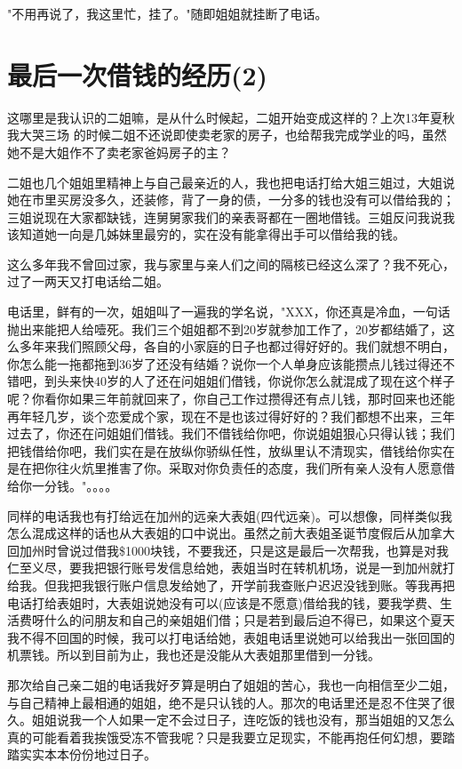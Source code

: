 \documentclass[12pt]{book}
\begin{document}
"不用再说了，我这里忙，挂了。"随即姐姐就挂断了电话。
\section{最后一次借钱的经历(2)}
\label{sec-33-2}
这哪里是我认识的二姐嘛，是从什么时候起，二姐开始变成这样的？上次13年夏秋我大哭三场 的时候二姐不还说即使卖老家的房子，也给帮我完成学业的吗，虽然她不是大姐作不了卖老家爸妈房子的主？

二姐也几个姐姐里精神上与自己最亲近的人，我也把电话打给大姐三姐过，大姐说她在市里买房没多久，还装修，背了一身的债，一分多的钱也没有可以借给我的；三姐说现在大家都缺钱，连舅舅家我们的亲表哥都在一圈地借钱。三姐反问我说我该知道她一向是几姊妹里最穷的，实在没有能拿得出手可以借给我的钱。

这么多年我不曾回过家，我与家里与亲人们之间的隔核已经这么深了？我不死心，过了一两天又打电话给二姐。

电话里，鲜有的一次，姐姐叫了一遍我的学名说，"XXX，你还真是冷血，一句话抛出来能把人给噎死。我们三个姐姐都不到20岁就参加工作了，20岁都结婚了，这么多年来我们照顾父母，各自的小家庭的日子也都过得好好的。我们就想不明白，你怎么能一拖都拖到36岁了还没有结婚？说你一个人单身应该能攒点儿钱过得还不错吧，到头来快40岁的人了还在问姐姐们借钱，你说你怎么就混成了现在这个样子呢？你看你如果三年前就回来了，你自己工作过攒得还有点儿钱，那时回来也还能再年轻几岁，谈个恋爱成个家，现在不是也该过得好好的？我们都想不出来，三年过去了，你还在问姐姐们借钱。我们不借钱给你吧，你说姐姐狠心只得认钱；我们把钱借给你吧，我们实在是在放纵你骄纵任性，放纵里认不清现实，借钱给你实在是在把你往火炕里推害了你。采取对你负责任的态度，我们所有亲人没有人愿意借给你一分钱。"。。。。

同样的电话我也有打给远在加州的远亲大表姐(四代远亲)。可以想像，同样类似我怎么混成这样的话也从大表姐的口中说出。虽然之前大表姐圣诞节度假后从加拿大回加州时曾说过借我\$1000块钱，不要我还，只是这是最后一次帮我，也算是对我仁至义尽，要我把银行账号发信息给她，表姐当时在转机机场，说是一到加州就打给我。但我把我银行账户信息发给她了，开学前我查账户迟迟没钱到账。等我再把电话打给表姐时，大表姐说她没有可以(应该是不愿意)借给我的钱，要我学费、生活费呀什么的问朋友和自己的亲姐姐们借；只是若到最后迫不得已，如果这个夏天我不得不回国的时候，我可以打电话给她，表姐电话里说她可以给我出一张回国的机票钱。所以到目前为止，我也还是没能从大表姐那里借到一分钱。

那次给自己亲二姐的电话我好歹算是明白了姐姐的苦心，我也一向相信至少二姐，与自己精神上最相通的姐姐，绝不是只认钱的人。那次的电话里还是忍不住哭了很久。姐姐说我一个人如果一定不会过日子，连吃饭的钱也没有，那当姐姐的又怎么真的可能看着我挨饿受冻不管我呢？只是我要立足现实，不能再抱任何幻想，要踏踏实实本本份份地过日子。
\end{document}
